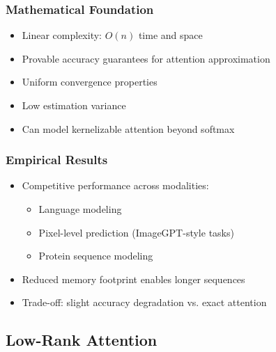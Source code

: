 \documentclass[11pt]{article}
\begin{document}
\subsubsection{Mathematical Foundation}
\begin{itemize}[leftmargin=*]
    \item Linear complexity: $O(n)$ time and space
    \item Provable accuracy guarantees for attention approximation
    \item Uniform convergence properties
    \item Low estimation variance
    \item Can model kernelizable attention beyond softmax
\end{itemize}

\subsubsection{Empirical Results}
\begin{itemize}[leftmargin=*]
    \item Competitive performance across modalities:
    \begin{itemize}
        \item Language modeling
        \item Pixel-level prediction (ImageGPT-style tasks)
        \item Protein sequence modeling
    \end{itemize}
    \item Reduced memory footprint enables longer sequences
    \item Trade-off: slight accuracy degradation vs. exact attention
\end{itemize}

\subsection{Low-Rank Attention}
\end{document}
